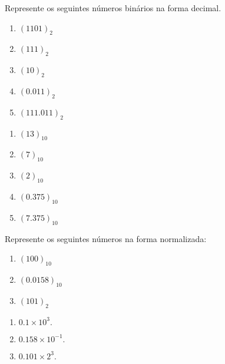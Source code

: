 \begin{ex}
Represente os seguintes números binários na forma decimal.
\begin{multicols}{2}
\begin{enumerate}[label=\alph*)]
\item $(1101)_2$
\item $(111)_2$
\item $(10)_2$
\item $(0.011)_2$
\item $(111.011)_2$
\end{enumerate}
\end{multicols}
\begin{sol}
\begin{enumerate}[label=\alph*)]
\item $(13)_{10}$
\item $(7)_{10}$
\item $(2)_{10}$
\item $(0.375)_{10}$
\item $(7.375)_{10}$
\end{enumerate}
\end{sol}
\end{ex}

\begin{ex}
Represente os seguintes números na forma normalizada:\label{ex.normalizada}
\begin{enumerate}[label=\alph*)]
\item $(100)_{10}$ 
\item $(0.0158)_{10}$
\item $(101)_2$
\end{enumerate}
\begin{sol}
\begin{enumerate}[label=\alph*)]
\item $0.1\times 10^3.$
\item $0.158\times 10^{-1}.$
\item $0.101\times 2^3.$
\end{enumerate}
\end{sol}
\end{ex}



